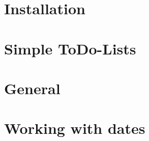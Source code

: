 \documentclass[t,handout]{beamer}
\begin{document}
\section{Installation}

%



\section{Simple ToDo-Lists}


\section{General}


\section{Working with dates}

\end{document}
